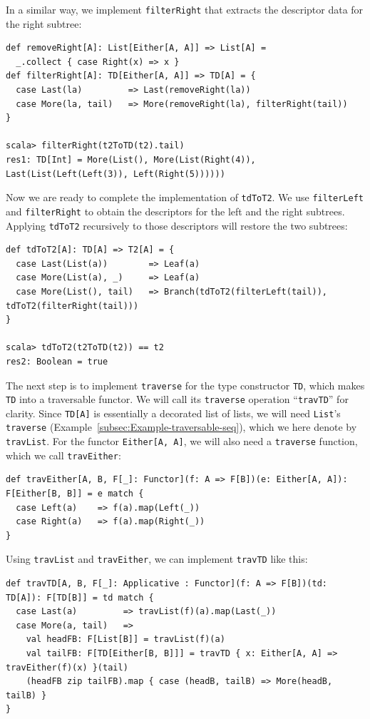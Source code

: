 In a similar way, we implement \lstinline!filterRight! that extracts
the descriptor data for the right subtree:
\begin{lstlisting}
def removeRight[A]: List[Either[A, A]] => List[A] =
  _.collect { case Right(x) => x }
def filterRight[A]: TD[Either[A, A]] => TD[A] = {
  case Last(la)         => Last(removeRight(la))
  case More(la, tail)   => More(removeRight(la), filterRight(tail))
}

scala> filterRight(t2ToTD(t2).tail)
res1: TD[Int] = More(List(), More(List(Right(4)), Last(List(Left(Left(3)), Left(Right(5))))))
\end{lstlisting}

Now we are ready to complete the implementation of \lstinline!tdToT2!.
We use \lstinline!filterLeft! and \lstinline!filterRight! to obtain
the descriptors for the left and the right subtrees. Applying \lstinline!tdToT2!
recursively to those descriptors will restore the two subtrees:
\begin{lstlisting}
def tdToT2[A]: TD[A] => T2[A] = {
  case Last(List(a))        => Leaf(a)
  case More(List(a), _)     => Leaf(a)
  case More(List(), tail)   => Branch(tdToT2(filterLeft(tail)), tdToT2(filterRight(tail)))
}

scala> tdToT2(t2ToTD(t2)) == t2
res2: Boolean = true
\end{lstlisting}

The next step is to implement \lstinline!traverse! for the type constructor
\lstinline!TD!, which makes \lstinline!TD! into a traversable functor.
We will call its \lstinline!traverse! operation \textsf{``}\lstinline!travTD!\textsf{''}
for clarity. Since \lstinline!TD[A]! is essentially a decorated list
of lists, we will need \lstinline!List!\textsf{'}s \lstinline!traverse! (Example~\ref{subsec:Example-traversable-seq}),
which we here denote by \lstinline!travList!. For the functor \lstinline!Either[A, A]!,
we will also need a \lstinline!traverse! function, which we call
\lstinline!travEither!:
\begin{lstlisting}
def travEither[A, B, F[_]: Functor](f: A => F[B])(e: Either[A, A]): F[Either[B, B]] = e match {
  case Left(a)    => f(a).map(Left(_))
  case Right(a)   => f(a).map(Right(_))
}
\end{lstlisting}
Using \lstinline!travList! and \lstinline!travEither!, we can implement
\lstinline!travTD! like this:
\begin{lstlisting}
def travTD[A, B, F[_]: Applicative : Functor](f: A => F[B])(td: TD[A]): F[TD[B]] = td match {
  case Last(a)         => travList(f)(a).map(Last(_))
  case More(a, tail)   =>
    val headFB: F[List[B]] = travList(f)(a)
    val tailFB: F[TD[Either[B, B]]] = travTD { x: Either[A, A] => travEither(f)(x) }(tail)
    (headFB zip tailFB).map { case (headB, tailB) => More(headB, tailB) }
}
\end{lstlisting}

